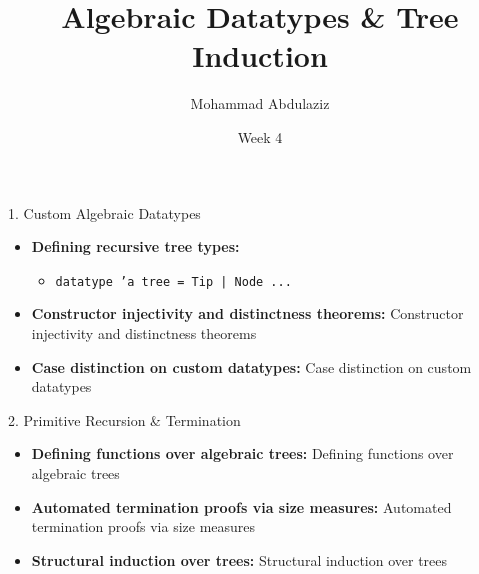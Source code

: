 \documentclass[compress,10pt,xcolor=dvipsnames]{beamer}
\title[Algebraic Datatypes & Tree Induction]{Algebraic Datatypes & Tree Induction}
\author[7CCSACTP]{Mohammad Abdulaziz}
\date{Week 4}
\begin{document}

\begin{frame}{1. Custom Algebraic Datatypes}

\begin{itemize}
  \item \textbf{Defining recursive tree types:}
    \begin{itemize}
      \item \texttt{datatype 'a tree = Tip | Node ...}
    \end{itemize}
  \item \textbf{Constructor injectivity and distinctness theorems:} Constructor injectivity and distinctness theorems
  \item \textbf{Case distinction on custom datatypes:} Case distinction on custom datatypes
\end{itemize}
\end{frame}

\begin{frame}{2. Primitive Recursion & Termination}

\begin{itemize}
  \item \textbf{Defining functions over algebraic trees:} Defining functions over algebraic trees
  \item \textbf{Automated termination proofs via size measures:} Automated termination proofs via size measures
  \item \textbf{Structural induction over trees:} Structural induction over trees
\end{itemize}
\end{frame}
\end{document}
